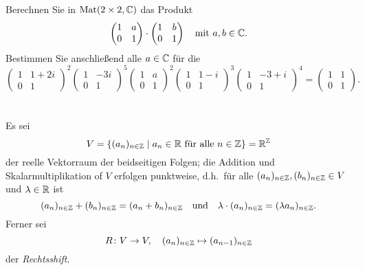 \documentclass[a4paper,9pt]{extarticle}
\begin{document}
\section{}
Berechnen Sie in $\mathrm{Mat}(2 \times 2, \mathbb{C})$ das Produkt
\[
 \begin{pmatrix}
   1 & a \\
   0 & 1
 \end{pmatrix}
 \cdot
 \begin{pmatrix}
  1 & b \\
  0 & 1
 \end{pmatrix}
 \quad
 \text{mit $a,b \in \mathbb{C}$}.
\]
Bestimmen Sie anschließend alle $a \in \mathbb{C}$ für die
\[
  \begin{pmatrix}
   1 & 1+2i \\
   0 & 1
 \end{pmatrix}^2
  \begin{pmatrix}
   1 & -3i \\
   0 &  1
 \end{pmatrix}^5
  \begin{pmatrix}
   1 & a \\
   0 & 1
 \end{pmatrix}^2
  \begin{pmatrix}
   1 & 1-i \\
   0 & 1
 \end{pmatrix}^3
  \begin{pmatrix}
   1 & -3+i \\
   0 &  1
 \end{pmatrix}^4
 =
 \begin{pmatrix}
  1 & 1 \\
  0 & 1
 \end{pmatrix}.
\]





\section{}
Es sei
\[
 V = \{ (a_n)_{n \in \mathbb{Z}} \mid \text{$a_n \in \mathbb{R}$ für alle $n \in \mathbb{Z}$}\} = \mathbb{R}^{\mathbb{Z}}
\]
der reelle Vektorraum der beidseitigen Folgen; die Addition und Skalarmultiplikation of $V$ erfolgen punktweise, d.h.\ für alle $(a_n)_{n \in \mathbb{Z}}, (b_n)_{n \in \mathbb{Z}} \in V$ und $\lambda \in \mathbb{R}$ ist
\[
 (a_n)_{n \in \mathbb{Z}} + (b_n)_{n \in \mathbb{Z}} = (a_n + b_n)_{n \in \mathbb{Z}}
 \quad\text{und}\quad
 \lambda \cdot (a_n)_{n \in \mathbb{Z}} = (\lambda a_n)_{n \in \mathbb{Z}}.
\]
Ferner sei
\[
 R \colon V \to V, \quad (a_n)_{n \in \mathbb{Z}} \mapsto (a_{n-1})_{n \in \mathbb{Z}}
\]
der \emph{Rechtsshift}.
\end{document}
